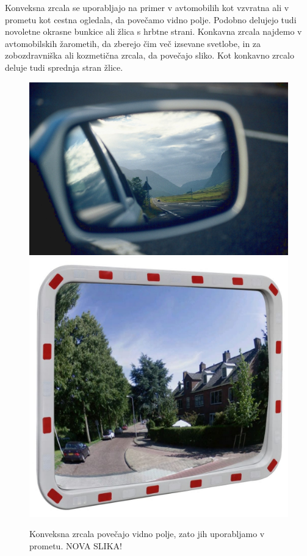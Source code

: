 \newpage
Konveksna zrcala se uporabljajo na primer v avtomobilih kot vzvratna ali v prometu kot
cestna ogledala, da povečamo vidno polje. Podobno delujejo tudi novoletne 
okrasne bunkice ali žlica s hrbtne strani. Konkavna zrcala najdemo v
avtomobilskih žarometih, da zberejo čim več izsevane svetlobe, in za zobozdravniška
ali kozmetična zrcala, da povečajo sliko. Kot konkavno zrcalo deluje tudi 
sprednja stran žlice.

\begin{figure}[!ht]
\centering
\includegraphics[width=7truecm]{slike/02_photos_avto.jpg}\hfill
\includegraphics[width=5truecm]{slike/Cesta.jpeg}
\caption{Konveksna zrcala povečajo vidno polje, zato jih uporabljamo v prometu. NOVA SLIKA!}
\label{fig:02_photos-4}
\end{figure}

